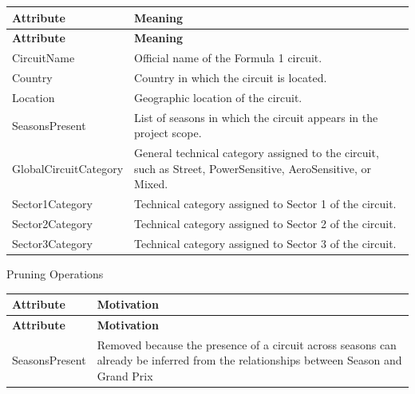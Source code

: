 \documentclass[a4paper,11pt]{article}
\begin{document}
	\begin{longtable}{|p{4cm}|p{10.8cm}|}
		\hline
		\textbf{Attribute} & \textbf{Meaning} \\
		\hline
		\endfirsthead
		
		\hline
		\textbf{Attribute} & \textbf{Meaning} \\
		\hline
		\endhead
		
		CircuitName & Official name of the Formula 1 circuit. \\ \hline
		
		Country & Country in which the circuit is located. \\ \hline
		
		Location & Geographic location of the circuit. \\ \hline
		
		SeasonsPresent & List of seasons in which the circuit appears in the project scope. \\ \hline
		
		GlobalCircuitCategory & General technical category assigned to the circuit, such as Street, PowerSensitive, AeroSensitive, or Mixed. \\ \hline
		
		Sector1Category & Technical category assigned to Sector 1 of the circuit. \\ \hline
		
		Sector2Category & Technical category assigned to Sector 2 of the circuit. \\ \hline
		
		Sector3Category & Technical category assigned to Sector 3 of the circuit. \\ \hline
		
	\end{longtable}
	
	
	
	Pruning Operations
	
	\begin{longtable}{|p{4.4cm}|p{10.8cm}|}
		\hline
		\textbf{Attribute} & \textbf{Motivation} \\
		\hline
		\endfirsthead
		
		\hline
		\textbf{Attribute} & \textbf{Motivation} \\
		\hline
		\endhead
		
		SeasonsPresent & Removed because the presence of a circuit across seasons can already be inferred from the relationships between Season and Grand Prix \\ \hline
		
	\end{longtable}
	
\end{document}
